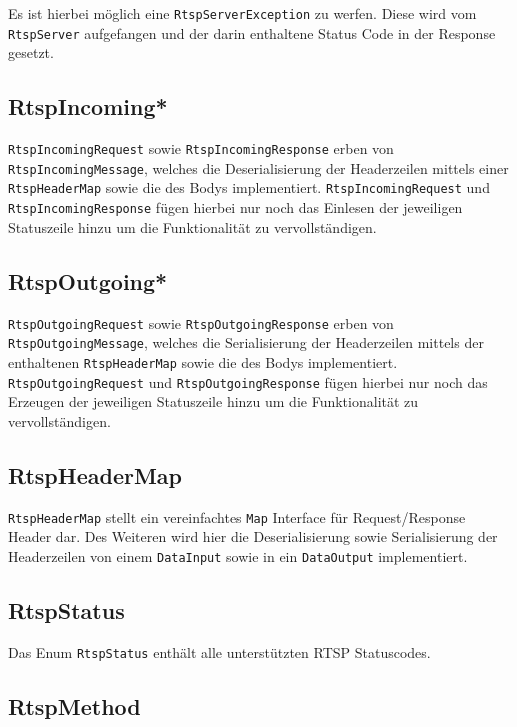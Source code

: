 \documentclass[a4paper,12pt]{article}
\begin{document}
Es ist hierbei möglich eine \texttt{RtspServerException} zu werfen.
Diese wird vom \texttt{RtspServer} aufgefangen und der darin enthaltene Status Code in der Response gesetzt.

\subsection{RtspIncoming*}

\texttt{RtspIncomingRequest} sowie \texttt{RtspIncomingResponse} erben von \texttt{RtspIncomingMessage}, welches die Deserialisierung der Headerzeilen mittels einer \texttt{RtspHeaderMap} sowie die des Bodys implementiert.
\texttt{RtspIncomingRequest} und \texttt{RtspIncomingResponse} fügen hierbei nur noch das Einlesen der jeweiligen Statuszeile hinzu um die Funktionalität zu vervollständigen.

\subsection{RtspOutgoing*}

\texttt{RtspOutgoingRequest} sowie \texttt{RtspOutgoingResponse} erben von \texttt{RtspOutgoingMessage}, welches die Serialisierung der Headerzeilen mittels der enthaltenen \texttt{RtspHeaderMap} sowie die des Bodys implementiert.
\texttt{RtspOutgoingRequest} und \texttt{RtspOutgoingResponse} fügen hierbei nur noch das Erzeugen der jeweiligen Statuszeile hinzu um die Funktionalität zu vervollständigen.

\subsection{RtspHeaderMap}

\texttt{RtspHeaderMap} stellt ein vereinfachtes \texttt{Map} Interface für Request/Response Header dar.
Des Weiteren wird hier die Deserialisierung sowie Serialisierung der Headerzeilen von einem \texttt{DataInput} sowie in ein \texttt{DataOutput} implementiert.

\subsection{RtspStatus}

Das Enum \texttt{RtspStatus} enthält alle unterstützten RTSP Statuscodes.

\subsection{RtspMethod}
\end{document}
